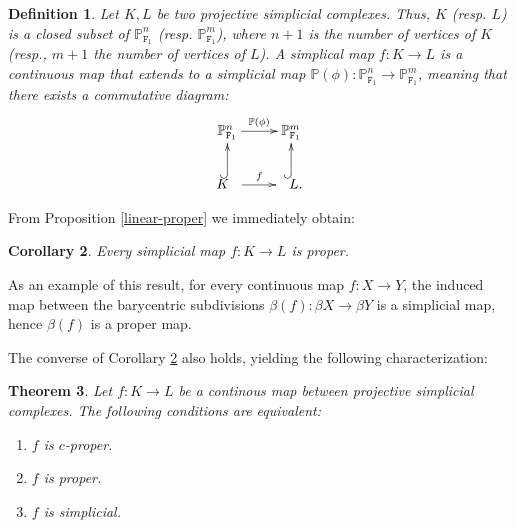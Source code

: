 \documentclass[amssymb,amscd,11pt,20pt]{amsart}
\newcommand{\FF}{{\mathtt F}}
\newcommand{\PP}{\mathbb P}
\newcommand{\0}{\mathbf 0}
\theoremstyle{plain}
\newtheorem{thm}{Theorem}[section]
\newtheorem{cor}[thm]{Corollary}
\newtheorem{defn}[thm]{Definition}
\numberwithin{equation}{thm}
\begin{document}
\begin{defn}{\rm Let $K,L$ be two projective simplicial complexes. Thus, $K$ (resp. $L$) is a closed subset of $\PP^n_{\FF_1}$ (resp.  $\PP^m_{\FF_1}$), where $n+1$ is the number of vertices of $K$ (resp., $m+1$ the number of vertices of $L$). A {\em simplical map} $f\colon K\to L$ is a continuous map that extends to a simplicial map $\PP(\phi)\colon \PP^n_{\FF_1}\to \PP^m_{\FF_1}$, meaning that there exists a commutative diagram:
$$
\xymatrix{ \PP^n_{\FF_1} \ar[r]^{\PP(\phi)} & \PP^m_{\FF_1} \\ K \ar@{^(->}[u]  \ar[r]^{f} \ \   & \  \ L . \ar@{^(->}[u]   }  
$$ }
\end{defn} From Proposition \ref{linear-proper} we immediately obtain:
\begin{cor}\label{simplicialisproper} Every simplicial map $f\colon K\to L$   is proper.
\end{cor} 

As an example of this result, for every continuous map $f\colon X\to Y$, the induced map between the barycentric subdivisions  $\beta(f)\colon \beta X\to\beta Y$ is a simplicial map, hence $\beta(f)$ is a proper map.

The converse of Corollary \ref{simplicialisproper} also holds, yielding the following characterization:

\begin{thm}\label{simplicial=proper} Let $f\colon K\to L$ be a continous map between projective simplicial complexes. The following conditions are equivalent:
\begin{enumerate}
\item $f$ is $c$-proper.
\item $f$ is proper.
\item $f$ is simplicial.
\end{enumerate} 
\end{thm}
\end{document}
